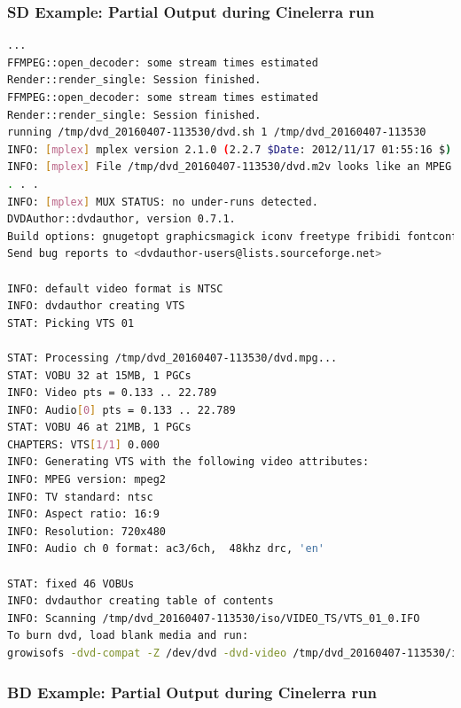 \subsubsection*{SD Example: Partial Output during Cinelerra run}
\label{ssub:sd_example_partial_output}

\begin{lstlisting}[language=bash]
...
FFMPEG::open_decoder: some stream times estimated
Render::render_single: Session finished.
FFMPEG::open_decoder: some stream times estimated
Render::render_single: Session finished.
running /tmp/dvd_20160407-113530/dvd.sh 1 /tmp/dvd_20160407-113530
INFO: [mplex] mplex version 2.1.0 (2.2.7 $Date: 2012/11/17 01:55:16 $)
INFO: [mplex] File /tmp/dvd_20160407-113530/dvd.m2v looks like an MPEG Video stream.
. . .
INFO: [mplex] MUX STATUS: no under-runs detected.
DVDAuthor::dvdauthor, version 0.7.1. 
Build options: gnugetopt graphicsmagick iconv freetype fribidi fontconfig
Send bug reports to <dvdauthor-users@lists.sourceforge.net>

INFO: default video format is NTSC
INFO: dvdauthor creating VTS
STAT: Picking VTS 01

STAT: Processing /tmp/dvd_20160407-113530/dvd.mpg...
STAT: VOBU 32 at 15MB, 1 PGCs
INFO: Video pts = 0.133 .. 22.789
INFO: Audio[0] pts = 0.133 .. 22.789
STAT: VOBU 46 at 21MB, 1 PGCs
CHAPTERS: VTS[1/1] 0.000
INFO: Generating VTS with the following video attributes:
INFO: MPEG version: mpeg2
INFO: TV standard: ntsc
INFO: Aspect ratio: 16:9
INFO: Resolution: 720x480
INFO: Audio ch 0 format: ac3/6ch,  48khz drc, 'en'

STAT: fixed 46 VOBUs                         
INFO: dvdauthor creating table of contents
INFO: Scanning /tmp/dvd_20160407-113530/iso/VIDEO_TS/VTS_01_0.IFO
To burn dvd, load blank media and run:
growisofs -dvd-compat -Z /dev/dvd -dvd-video /tmp/dvd_20160407-113530/iso
\end{lstlisting}

\subsubsection*{BD Example: Partial Output during Cinelerra run}
\label{ssub:bd_example_partial_output}

